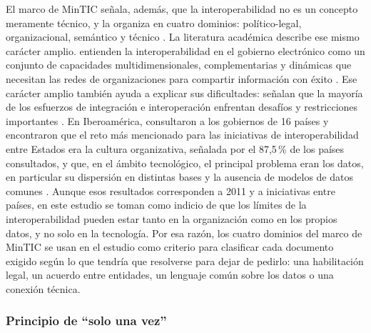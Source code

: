 El marco de MinTIC señala, además, que la interoperabilidad no es un concepto meramente técnico, y la organiza en cuatro dominios: político-legal, organizacional, semántico y técnico \parencite[p.~33]{mintic2019marco}. La literatura académica describe ese mismo carácter amplio. \textcite{pardo2012interoperability} entienden la interoperabilidad en el gobierno electrónico como un conjunto de capacidades multidimensionales, complementarias y dinámicas que necesitan las redes de organizaciones para compartir información con éxito . Ese carácter amplio también ayuda a explicar sus dificultades: \textcite{scholl2007integration} señalan que la mayoría de los esfuerzos de integración e interoperación enfrentan desafíos y restricciones importantes . En Iberoamérica, \textcite{criado2011interoperabilidad} consultaron a los gobiernos de 16 países \parencite{criado2011interoperabilidad} y encontraron que el reto más mencionado para las iniciativas de interoperabilidad entre Estados era la cultura organizativa, señalada por el 87,5\,\% de los países consultados, y que, en el ámbito tecnológico, el principal problema eran los datos, en particular su dispersión en distintas bases y la ausencia de modelos de datos comunes . Aunque esos resultados corresponden a 2011 y a iniciativas entre países, en este estudio se toman como indicio de que los límites de la interoperabilidad pueden estar tanto en la organización como en los propios datos, y no solo en la tecnología. Por esa razón, los cuatro dominios del marco de MinTIC se usan en el estudio como criterio para clasificar cada documento exigido según lo que tendría que resolverse para dejar de pedirlo: una habilitación legal, un acuerdo entre entidades, un lenguaje común sobre los datos o una conexión técnica.

\subsubsection{Principio de \enquote{solo una vez}}

